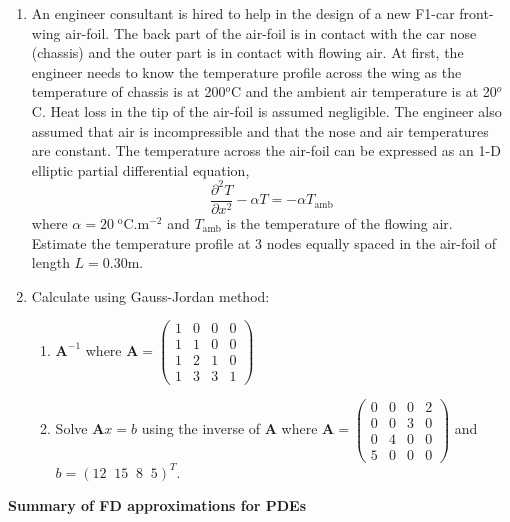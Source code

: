 \documentclass[12pts,a4paper,amsmath,amssymb,floatfix]{article}%
\newcommand{\frc}{\displaystyle\frac}
\begin{document}
\begin{enumerate}[{\bf Problem 1:}]
\item An engineer consultant is hired to help in the design of a new F1-car front-wing air-foil. The back part of the air-foil is in contact with the car nose (chassis) and the outer part is in contact with flowing air. At first, the engineer needs to know the temperature profile across the wing as the temperature of chassis is at 200$^{o}$C and the ambient air temperature is at 20$^{o}$C. Heat loss in the tip of the air-foil is assumed negligible. The engineer also assumed that air is incompressible and that the nose and air temperatures are constant. The temperature across the air-foil can be expressed as an 1-D elliptic partial differential equation,
\begin{displaymath}
\frc{\partial^{2} T}{\partial x^{2}} -\alpha T = -\alpha T_{\text{amb}}
\end{displaymath} 
where $\alpha=20\;^{\text{o}}$C.m$^{-2}$ and $T_{\text{amb}}$ is the temperature of the flowing air. Estimate the temperature profile at 3 nodes equally spaced in the air-foil of length $L=0.30$m.


\item Calculate using Gauss-Jordan method:
\begin{enumerate}
\item $\bm{A}^{-1}$ where $\bm{A} = \begin{pmatrix}
1 & 0 & 0 & 0 \\ 1 & 1 & 0 & 0 \\ 1 & 2 & 1 & 0 \\ 1 & 3 & 3 & 1
\end{pmatrix}$

\item Solve $\bm{A}x=b$ using the inverse of $\bm{A}$ where $\bm{A}=\begin{pmatrix}0 & 0 & 0 & 2 \\ 0 & 0 & 3 & 0 \\ 0 & 4 & 0 & 0 \\ 5 & 0 & 0  & 0 \end{pmatrix}$ and $b=\left(12\;\; 15\;\;  8\;\; 5\right)^{T}$. 
\end{enumerate}

\end{enumerate}

\clearpage

\begin{center}
{\bf {\Large Summary of FD approximations for PDEs}}
\end{center}
\end{document}
